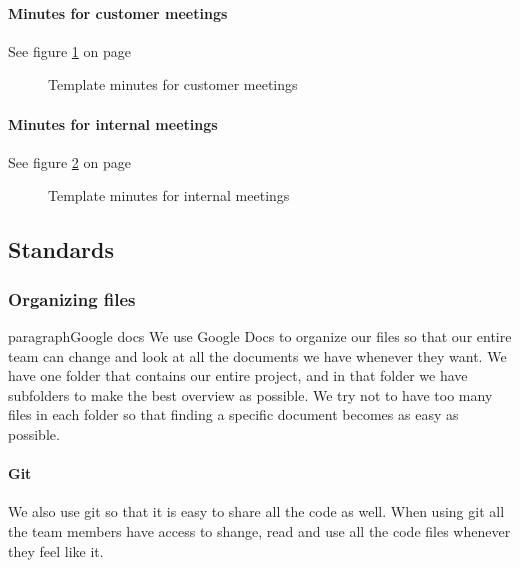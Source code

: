 \paragraph{Minutes for customer meetings} \hfill
\newline
See figure \ref{fig:minutescustomer} on page \pageref{fig:minutescustomer}
\begin{figure}[hbt]
\begin{center}
\caption{Template minutes for customer meetings}\label{fig:minutescustomer}
\end{center}
\end{figure}

\paragraph{Minutes for internal meetings} \hfill
\newline
See figure \ref{fig:minutesinternal} on page \pageref{fig:minutesinternal}
\begin{figure}[hbt]
\begin{center}
\caption{Template minutes for internal meetings}\label{fig:minutesinternal}
\end{center}
\end{figure}

\subsection{Standards}

\subsubsection{Organizing files}
paragraph{Google docs}\hfill
 We use Google Docs to organize our files so that our entire team can change and look at all the documents we have whenever they want. We have one folder that contains our entire project, and in that folder we have subfolders to make the best overview as possible. We try not to have too many files in each folder so that finding a specific document becomes as easy as possible.

\paragraph{Git}\hfill 
We also use git so that it is easy to share all the code as well. When using git all the team members have access to shange, read and use all the code files whenever they feel like it.

